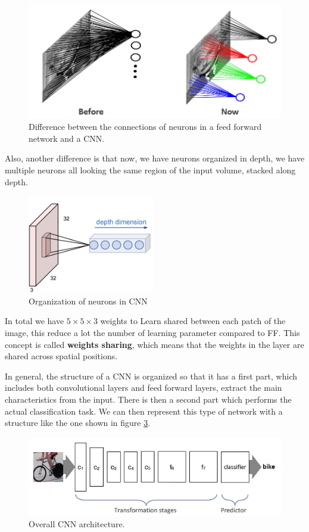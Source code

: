 \begin{figure}[!ht]
    \centering
    \includegraphics[width=0.5\linewidth]{img/CNN/localConn.png}
    \caption{Difference between the connections of neurons in a feed forward network and a CNN.}
    \label{fig:localConn}
\end{figure}

Also, another difference is that now, we have neurons organized in depth, we have 
multiple neurons all looking the same region of the input volume, stacked along depth.

\begin{figure}[!ht]
    \centering
    \includegraphics[width=0.25\linewidth]{img/CNN/depth.png}
    \caption{Organization of neurons in CNN}
    \label{fig:depth}
\end{figure}

In total we have $5\times 5\times 3$ weights to Learn
shared between each patch of the image, this reduce a lot the number of learning 
parameter compared to FF.  
This concept is called \textbf{weights sharing}, which means that the weights 
in the layer are shared across spatial positions. 

In general, the structure of a CNN is organized so that it has a first part, which 
includes both convolutional layers and feed forward layers, extract the main 
characteristics from the input. There is then a second part which performs the actual
classification task. We can then represent this type of network with a structure like 
the one shown in figure \ref{fig:cnn-arc}.

\begin{figure}[!ht]
    \centering
    \includegraphics[width=\linewidth]{img/CNN/CNNarc.png}
    \caption{Overall CNN architecture.}
    \label{fig:cnn-arc}
\end{figure}

